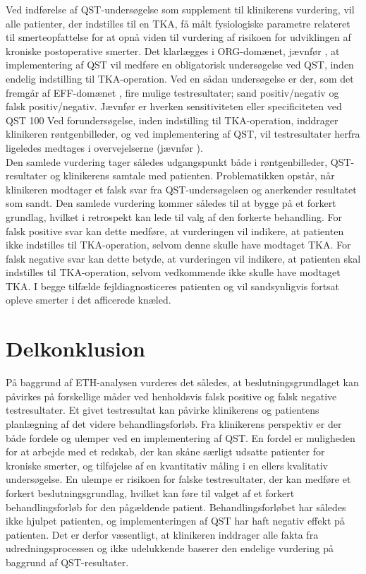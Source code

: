 Ved indførelse af QST-undersøgelse som supplement til klinikerens vurdering, vil alle patienter, der indstilles til en TKA, få målt fysiologiske parametre relateret til smerteopfattelse for at opnå viden til vurdering af risikoen for udviklingen af kroniske postoperative smerter. 
Det klarlægges i ORG-domænet, jævnfør , at implementering af QST vil medføre en obligatorisk undersøgelse ved QST, inden endelig indstilling til TKA-operation. Ved en sådan undersøgelse er der, som det fremgår af EFF-domænet , fire mulige testresultater; sand positiv/negativ og falsk positiv/negativ. Jævnfør  er hverken sensitiviteten eller specificiteten ved QST 100%
Ved forundersøgelse, inden indstilling til TKA-operation, inddrager klinikeren røntgenbilleder, og ved implementering af QST, vil testresultater herfra ligeledes medtages i overvejelserne (jævnfør ). \\
Den samlede vurdering tager således udgangspunkt både i røntgenbilleder, QST-resultater og klinikerens samtale med patienten. Problematikken opstår, når klinikeren modtager et falsk svar fra QST-undersøgelsen og anerkender resultatet som sandt. Den samlede vurdering kommer således til at bygge på et forkert grundlag, hvilket i retrospekt kan lede til valg af den forkerte behandling. 
For falsk positive svar kan dette medføre, at vurderingen vil indikere, at patienten ikke indstilles til TKA-operation, selvom denne skulle have modtaget TKA.
For falsk negative svar kan dette betyde, at vurderingen vil indikere, at patienten skal indstilles til TKA-operation, selvom vedkommende ikke skulle have modtaget TKA.
I begge tilfælde fejldiagnosticeres patienten og vil sandsynligvis fortsat opleve smerter i det afficerede knæled.


\section{Delkonklusion}
På baggrund af ETH-analysen vurderes det således, at beslutningsgrundlaget kan påvirkes på forskellige måder ved henholdsvis falsk positive og falsk negative testresultater. Et givet testresultat kan påvirke klinikerens og patientens planlægning af det videre behandlingsforløb. 
Fra klinikerens perspektiv er der både fordele og ulemper ved en implementering af QST. En fordel er muligheden for at arbejde med et redskab, der kan skåne særligt udsatte patienter for kroniske smerter, og tilføjelse af en kvantitativ måling i en ellers kvalitativ undersøgelse. En ulempe er risikoen for falske testresultater, der kan medføre et forkert beslutningsgrundlag, hvilket kan føre til valget af et forkert behandlingsforløb for den pågældende patient. Behandlingsforløbet har således ikke hjulpet patienten, og implementeringen af QST har haft negativ effekt på patienten. Det er derfor væsentligt, at klinikeren inddrager alle fakta fra udredningsprocessen og ikke udelukkende baserer den endelige vurdering på baggrund af QST-resultater.